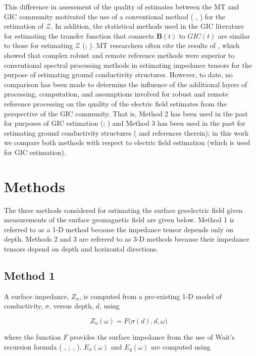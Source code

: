 \documentclass[linenumbers,draft]{agujournal}
\newcommand{\citeay}[1]{%
\citeauthor{#1}, \citeyear{#1}%
}
\begin{document}
This difference in assessment of the quality of estimates between the MT and GIC community motivated the use of a conventional method (\citeay{Sims1971}) for the estimation of $\mathcal{Z}$.  In addition, the statistical methods used in the GIC literature for estimating the transfer function that connects $\mathbf{B}(t)$ to $GIC(t)$ are similar to those for estimating $\mathcal{Z}$ (\cite{McKay2003}; \cite{Pulkkinen2007}). MT researchers often cite the results of \cite{Jones1989}, which showed that complex robust and remote reference methods were superior to conventional spectral processing methods in estimating impedance tensors for the purpose of estimating ground conductivity structures.  However, to date, no comparison has been made to determine the influence of the additional layers of processing, computation, and assumptions involved for robust and remote reference processing on the quality of the electric field estimates from the perspective of the GIC community.  That is, Method 2 has been used in the past for purposes of GIC estimation (\cite{McKay2003}; \cite{Pulkkinen2007}) and Method 3 has been used in the past for estimating ground conductivity structures (\cite{Chave2012} and references therein); in this work we compare both methods with respect to electric field estimation (which is used for GIC estimation).

\section{Methods}

The three methods considered for estimating the surface geoelectric field given measurements of the surface geomagnetic field are given below.  Method 1 is referred to as a 1-D method because the impedance tensor depends only on depth.  Methods 2 and 3 are referred to as 3-D methods because their impedance tensors depend on depth and horizontal directions.

\subsection{Method 1}

A surface impedance, $Z_n$, is computed from a pre-existing 1-D model of conductivity, $\sigma$, versus depth, $d$, using

\begin{equation}
Z_{n}(\omega) = F\big(\sigma(d),d,\omega\big)
\end{equation}

\noindent where the function $F$ provides the surface impedance from the use of Wait's recursion formula (\citeay{Wait1954}; \citeay{Simpson2005}). $E_x(\omega)$ and $E_y(\omega)$ are computed using
\end{document}

